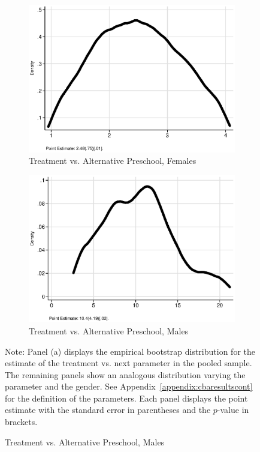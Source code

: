 \begin{figure}
\begin{subfigure}[h]{0.25\textwidth}
\end{subfigure}%
\begin{subfigure}[h]{0.25\textwidth}
	\centering
	\caption{Treatment vs. Alternative Preschool, Females}
		\includegraphics[width=\textwidth]{output/ratios_8_sexf.eps}
\end{subfigure}%
\begin{subfigure}[h]{0.25\textwidth}
	\centering
	\caption{Treatment vs. Alternative Preschool, Males}
		\includegraphics[width=\textwidth]{output/ratios_8_sexm.eps}
\end{subfigure}
\footnotesize \justify
Note: Panel (a) displays the empirical bootstrap distribution for the estimate of the treatment vs. next parameter in the pooled sample. The remaining panels show an analogous distribution varying the parameter and the gender. See Appendix~\ref{appendix:cbaresultscont} for the definition of the parameters. Each panel displays the point estimate with the standard error in parentheses and the $p$-value in brackets.
\end{figure}
\restoregeometry
\doublespacing

